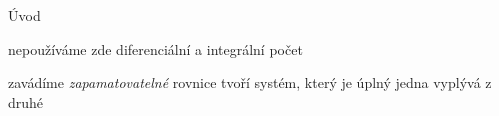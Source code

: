 
\chapter*{}{Úvod}

nepoužíváme zde diferenciální a integrální počet

zavádíme {\em zapamatovatelné\/} rovnice
tvoří systém, který je úplný
jedna vyplývá z druhé

